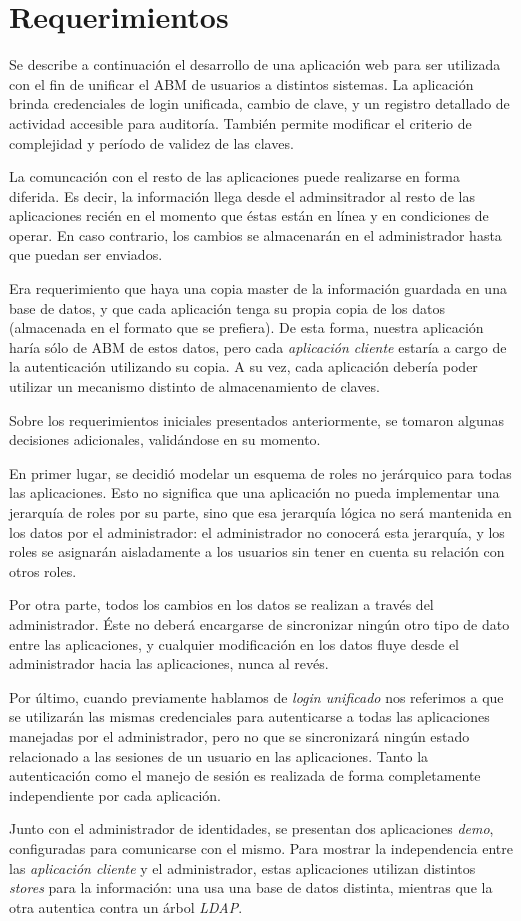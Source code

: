 \section{Requerimientos}

Se describe a continuación el desarrollo de una aplicación web para ser utilizada con el fin de
unificar el ABM de usuarios a distintos sistemas. La aplicación brinda credenciales de login unificada,
cambio de clave, y un registro detallado de actividad accesible para auditoría. También permite modificar
el criterio de complejidad y período de validez de las claves.

La comuncación con el resto de las aplicaciones puede realizarse en forma diferida. Es decir, la información
llega desde el adminsitrador al resto de las aplicaciones recién en el momento que éstas están en línea
y en condiciones de operar. En caso contrario, los cambios se almacenarán en el administrador hasta
que puedan ser enviados.

Era requerimiento que haya una copia master de la información guardada en una base de datos, y que cada
aplicación tenga su propia copia de los datos (almacenada en el formato que se prefiera). De esta forma,
nuestra aplicación haría sólo de ABM de estos datos, pero cada \textit{aplicación cliente} estaría a cargo 
de la autenticación utilizando su copia. A su vez, cada aplicación debería poder utilizar un mecanismo distinto
de almacenamiento de claves.

Sobre los requerimientos iniciales presentados anteriormente, se tomaron algunas decisiones adicionales,
validándose en su momento.

En primer lugar, se decidió modelar un esquema de roles no jerárquico para todas las aplicaciones. Esto no
significa que una aplicación no pueda implementar una jerarquía de roles por su parte, sino que esa jerarquía
lógica no será mantenida en los datos por el administrador: el administrador no conocerá esta jerarquía, y los
roles se asignarán aisladamente a los usuarios sin tener en cuenta su relación con otros roles.

Por otra parte, todos los cambios en los datos se realizan a través del administrador. Éste no deberá encargarse
de sincronizar ningún otro tipo de dato entre las aplicaciones, y cualquier modificación en los datos fluye
desde el administrador hacia las aplicaciones, nunca al revés.

Por último, cuando previamente hablamos de \textit{login unificado} nos referimos a que se utilizarán las mismas
credenciales para autenticarse a todas las aplicaciones manejadas por el administrador, pero no que se sincronizará
ningún estado relacionado a las sesiones de un usuario en las aplicaciones. Tanto la autenticación como el manejo
de sesión es realizada de forma completamente independiente por cada aplicación.

Junto con el administrador de identidades, se presentan dos aplicaciones \textit{demo}, configuradas para 
comunicarse con el mismo. Para mostrar la independencia entre las \textit{aplicación cliente} y el administrador,
estas aplicaciones utilizan distintos \textit{stores} para la información: una usa una base de datos distinta,
mientras que la otra autentica contra un árbol \textit{LDAP}.